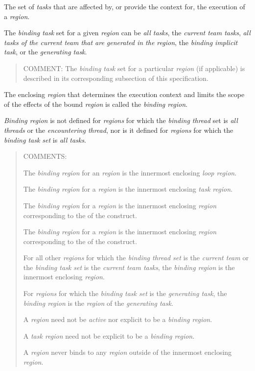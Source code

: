 \glossarydefstart
The set of \emph{tasks} that are affected by, or provide the context for, 
the execution of a \emph{region}.

The \emph{binding task} set for a given \emph{region} can be \emph{all tasks},
the \emph{current team tasks}, 
\emph{all tasks of the current team that are generated in the region}, the 
\emph{binding implicit task}, or the \emph{generating task}.

\begin{quote}
COMMENT: The \emph{binding task} set for a particular \emph{region} (if 
applicable) is described in its corresponding subsection of this specification.
\end{quote}
\glossarydefend

\glossarydefstart
The enclosing \emph{region} that determines the execution context and limits 
the scope of the effects of the bound \emph{region} is called the 
\emph{binding region}.

\emph{Binding region} is not defined for \emph{regions} for which the 
\emph{binding thread} set is \emph{all threads} or the 
\emph{encountering thread}, nor is it defined for \emph{regions} for 
which the \emph{binding task set} is \emph{all tasks}.

\begin{quote}
COMMENTS:

The \emph{binding region} for an  \emph{region} is the 
innermost enclosing \emph{loop region}.

The \emph{binding region} for a  \emph{region} is the 
innermost enclosing \emph{task region}.

The \emph{binding region} for a  \emph{region} is the 
innermost enclosing \emph{region} corresponding to the 
 of the  construct.

The \emph{binding region} for a  \emph{region} 
is the innermost enclosing \emph{region} corresponding to the 
 of the  construct.

For all other \emph{regions} for which the \emph{binding thread set} is 
the \emph{current team} or the \emph{binding task set} is the 
\emph{current team tasks}, the \emph{binding region} is the innermost 
enclosing  \emph{region}.

For \emph{regions} for which the \emph{binding task set} is the 
\emph{generating task}, the \emph{binding region} is the \emph{region} 
of the \emph{generating task}.

A  \emph{region} need not be \emph{active} nor explicit 
to be a \emph{binding region}.

A \emph{task region} need not be explicit to be a \emph{binding region}.

A \emph{region} never binds to any \emph{region} outside of the innermost 
enclosing  \emph{region}.
\end{quote}
\glossarydefend

